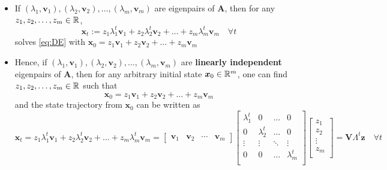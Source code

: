 \documentclass[12pt,a4paper]{article}
\begin{document}
\begin{itemize}
\begin{itemize}
  \item If $(\lambda_{1}, \bm{v}_{1}), (\lambda_{2}, \bm{v}_{2}), \ldots, (\lambda_{m}, \bm{v}_{m})$ are eigenpairs of $\bm{A}$,
    then for any $z_{1}, z_{2},\ldots, z_{m}\in \mathbb{R}$,
    \begin{equation}\nonumber%
      \bm{x}_{t} := z_{1}\lambda_{1}^{t}\bm{v}_{1} + z_{2}\lambda_{2}^{t}\bm{v}_{2} + \ldots + z_{m}\lambda_{m}^{t}\bm{v}_{m} \quad \forall t
    \end{equation}
    solves \eqref{eq:DE} with $\bm{x}_{0}=z_{1}\bm{v}_{1} + z_{2}\bm{v}_{2} + \ldots + z_{m}\bm{v}_{m}$

  \item Hence, if $(\lambda_{1}, \bm{v}_{1}), (\lambda_{2}, \bm{v}_{2}), \ldots, (\lambda_{m}, \bm{v}_{m})$ are \textbf{linearly independent} eigenpairs of $\bm{A}$,
    then for any arbitrary initial state $\bm{x}_{0}\in \mathbb{R}^{m}$,
    one can find $z_{1}, z_{2},\ldots, z_{m}\in \mathbb{R}$ such that
    \begin{equation}\nonumber%
      \bm{x}_{0}
      = z_{1}\bm{v}_{1} + z_{2}\bm{v}_{2} + \ldots + z_{m}\bm{v}_{m}
    \end{equation}
    and the state trajectory from $\bm{x}_{0}$ can be written as
    \begin{equation}\nonumber%
      \bm{x}_{t}
      = z_{1}\lambda_{1}^{t}\bm{v}_{1} + z_{2}\lambda_{2}^{t}\bm{v}_{2} + \ldots + z_{m}\lambda_{m}^{t}\bm{v}_{m}
      =
      \begin{bmatrix}
        \bm{v}_{1} & \bm{v}_{2} & \cdots & \bm{v}_{m}
      \end{bmatrix}
      \begin{bmatrix}
        \lambda_{1}^{t} & 0 & \ldots & 0 \\
        0 & \lambda_{2}^{t} & \ldots & 0 \\
        \vdots & \vdots & \ddots & \vdots \\
        0 & 0 & \ldots & \lambda_{m}^{t} \\
      \end{bmatrix}
      \begin{bmatrix}
        z_{1} \\
        z_{2} \\
        \vdots \\
        z_{m} \\
      \end{bmatrix}
      =
      \bm{V}\Lambda^{t}\bm{z}
      \quad \forall t
    \end{equation}
    

\end{itemize}
\end{itemize}
\end{document}
